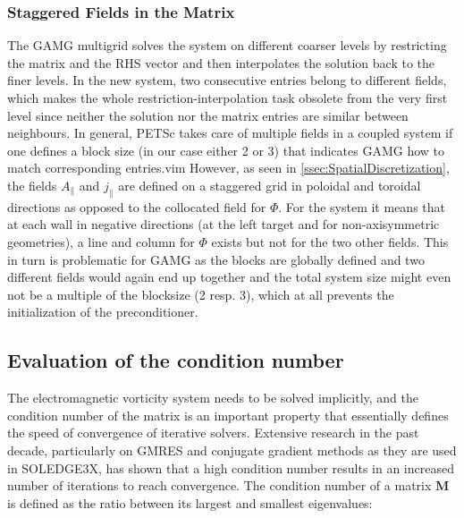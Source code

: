 \subsubsection{Staggered Fields in the Matrix}
\label{ssec:StaggeredFieldsMatrix}

The GAMG multigrid solves the system on different coarser levels by restricting the matrix and the RHS vector and then interpolates the solution back to the finer levels. In the new system, two consecutive entries belong to different fields, which makes the whole restriction-interpolation task obsolete from the very first level since neither the solution nor the matrix entries are similar between neighbours. In general, PETSc takes care of multiple fields in a coupled system if one defines a block size (in our case either 2 or 3) that indicates GAMG how to match corresponding entries.vim  However, as seen in \autoref{ssec:SpatialDiscretization}, the fields $A_\parallel$ and $j_\parallel$ are defined on a staggered grid in poloidal and toroidal directions as opposed to the collocated field for $\Phi$. For the system it means that at each wall in negative directions (at the left target and for non-axisymmetric geometries), a line and column for $\Phi$ exists but not for the two other fields. This in turn is problematic for GAMG as the blocks are globally defined and two different fields would again end up together and the total system size might even not be a multiple of the blocksize (2 resp. 3), which at all prevents the initialization of the preconditioner. \\



\subsection{Evaluation of the condition number}

The electromagnetic vorticity system needs to be solved implicitly, and the condition number of the matrix is an important property that essentially defines the speed of convergence of iterative solvers. Extensive research in the past decade\cite{pyzara2011influence, strakos1991linear, drkovsova1995numerical, greenbaum1997numerical}, particularly on GMRES and conjugate gradient methods as they are used in SOLEDGE3X, has shown that a high condition number results in an increased number of iterations to reach convergence. The condition number of a matrix $\textbf{M}$ is defined as the ratio between its largest and smallest eigenvalues:

